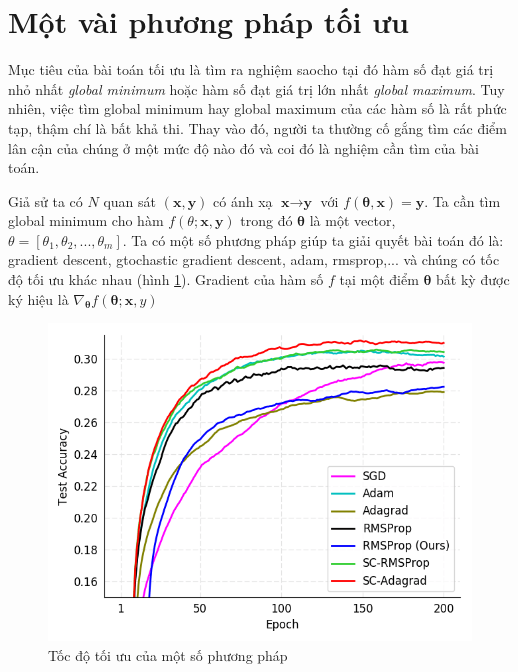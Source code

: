 \section{Một vài phương pháp tối ưu}
\label{sec:toiuu}
 Mục tiêu của bài toán tối ưu là tìm ra nghiệm saocho tại đó hàm số đạt giá trị nhỏ nhất \textit{global minimum} hoặc hàm số đạt giá trị lớn nhất \textit{global maximum}.  Tuy nhiên, việc tìm global minimum hay global maximum của các hàm số là rất phức tạp, thậm chí là bất khả thi. Thay vào đó, người ta thường cố gắng tìm các điểm lân cận của chúng ở một mức độ nào đó và coi đó là nghiệm cần tìm của bài toán. \par 
Giả sử ta có $N$ quan sát $(\textbf{x},\textbf{y})$ có ánh xạ $\textbf{x} \to \textbf{y}$ với $f(\mathbf{\theta},\textbf{x})=\textbf{y}$. Ta cần tìm global minimum cho hàm $f(\theta;\textbf{x},\textbf{y})$ trong đó $\mathbf{\theta}$ là một vector, $\theta=[\theta_1,\theta_2,...,\theta_m]$. Ta có một số phương pháp giúp ta giải quyết bài toán đó là: gradient descent, gtochastic gradient descent, adam, rmsprop,... và chúng có tốc độ tối ưu khác nhau (hình \ref{fig:convex}). Gradient của hàm số $f$ tại một điểm   $\mathbf{\theta}$ bất kỳ được ký hiệu là $\nabla_\mathbf{\theta} f(\mathbf{\theta};\textbf{x},y)$\par
\begin{figure}[H]
\begin{center}
\includegraphics[scale=0.5]{chap3/image/aa.png}
\end{center}
\caption{Tốc độ tối ưu của một số phương pháp}
\label{fig:convex}
\end{figure}

